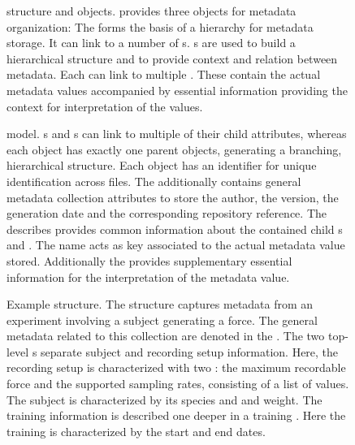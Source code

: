 \begin{figure}
    \centering
    
    \caption[ structure and objects]{ structure and objects.  provides three objects for metadata organization: The   forms the basis of a hierarchy for metadata storage. It can link to a number of  s. s are used to build a hierarchical structure and to provide context and relation between metadata. Each  can link to multiple . These contain the actual metadata values accompanied by essential information providing the context for interpretation of the values.}
    \label{fig:intro_odML_structure}
\end{figure}

\begin{figure}
    \centering
    \scalebox{0.8}{
    }
    \caption[ model]{ model. s and s can link to multiple of their child attributes, whereas each object has exactly one parent objects, generating a branching, hierarchical structure. Each object has an identifier  for unique identification across files. The  additionally contains general metadata collection attributes to store the author, the version, the generation date and the corresponding repository reference. The  describes provides common information about the contained child s and . The  name acts as key associated to the actual metadata value stored. Additionally the  provides supplementary essential information for the interpretation of the metadata value.}
    \label{fig:intro_odML_model}
\end{figure}

\begin{figure}
 \centering
 \scalebox{0.45}{
 }
 \caption[Example  structure]{Example  structure. The  structure captures metadata from an experiment involving a subject generating a force. The general metadata related to this collection are denoted in the  . The two top-level s separate subject and recording setup information. Here, the recording setup is characterized with two : the maximum recordable force and the supported sampling rates, consisting of a list of values. The subject is characterized by its species and and weight. The training information is described one deeper in a training . Here the training is characterized by the start and end dates.}
 \label{fig:intro_example_odml_structure}
\end{figure}

